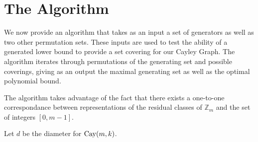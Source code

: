 

\section{The Algorithm}

We now provide an algorithm that takes as an input a set of generators as well as two other permutation sets. These inputs are used to test the ability of a generated lower bound to provide a set covering for our Cayley Graph. The algorithm iterates through permutations of the generating set and possible coverings, giving as an output the maximal generating set as well as the optimal polynomial bound.

\noindent
The algorithm takes advantage of the fact that there exists a one-to-one correspondance between representations of the residual classes of $\mathbb{Z}_{m}$ and the set of integers $[0, m-1]$.\n

\noindent
Let $d$ be the diameter for $\operatorname{Cay}(m, k)$.\n 

